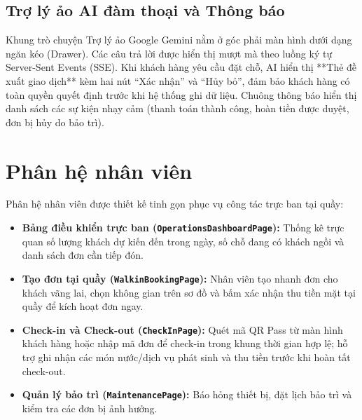 \subsection{Trợ lý ảo AI đàm thoại và Thông báo}
Khung trò chuyện Trợ lý ảo Google Gemini nằm ở góc phải màn hình dưới dạng ngăn kéo (Drawer). Các câu trả lời được hiển thị mượt mà theo luồng ký tự Server-Sent Events (SSE). Khi khách hàng yêu cầu đặt chỗ, AI hiển thị **Thẻ đề xuất giao dịch** kèm hai nút ``Xác nhận'' và ``Hủy bỏ'', đảm bảo khách hàng có toàn quyền quyết định trước khi hệ thống ghi dữ liệu. Chuông thông báo hiển thị danh sách các sự kiện nhạy cảm (thanh toán thành công, hoàn tiền được duyệt, đơn bị hủy do bảo trì).


\section{Phân hệ nhân viên}
\label{sec:gd_nhanvien}

Phân hệ nhân viên được thiết kế tinh gọn phục vụ công tác trực ban tại quầy:
\begin{itemize}
    \item \textbf{Bảng điều khiển trực ban (\texttt{OperationsDashboardPage}):} Thống kê trực quan số lượng khách dự kiến đến trong ngày, số chỗ đang có khách ngồi và danh sách đơn cần tiếp đón.
    \item \textbf{Tạo đơn tại quầy (\texttt{WalkinBookingPage}):} Nhân viên tạo nhanh đơn cho khách vãng lai, chọn không gian trên sơ đồ và bấm xác nhận thu tiền mặt tại quầy để kích hoạt đơn ngay.
    \item \textbf{Check-in và Check-out (\texttt{CheckInPage}):} Quét mã QR Pass từ màn hình khách hàng hoặc nhập mã đơn để check-in trong khung thời gian hợp lệ; hỗ trợ ghi nhận các món nước/dịch vụ phát sinh và thu tiền trước khi hoàn tất check-out.
    \item \textbf{Quản lý bảo trì (\texttt{MaintenancePage}):} Báo hỏng thiết bị, đặt lịch bảo trì và kiểm tra các đơn bị ảnh hưởng.
\end{itemize}


